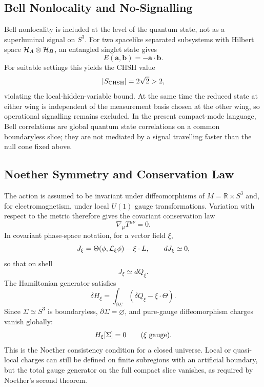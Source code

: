 \documentclass[
  aps,
  prd,
  reprint,
  superscriptaddress,
  nofootinbib,
  longbibliography,
  floatfix,
  amsmath,
  amssymb
]{revtex4-2}
\theoremstyle{plain}
\theoremstyle{definition}
\theoremstyle{remark}
\begin{document}
\subsection{Bell Nonlocality and No-Signalling}

Bell nonlocality is included at the level of the quantum state, not as a
superluminal signal on \(S^3\). For two spacelike separated subsystems
with Hilbert space \({\cal H}_A\otimes{\cal H}_B\), an entangled singlet
state gives
\begin{equation}
  E(\mathbf a,\mathbf b)=-\mathbf a\cdot\mathbf b .
\end{equation}
For suitable settings this yields the CHSH value
\begin{equation}
  |S_{\rm CHSH}|=2\sqrt2>2,
\end{equation}
violating the local-hidden-variable bound. At the same time the reduced
state at either wing is independent of the measurement basis chosen at
the other wing, so operational signalling remains excluded. In the
present compact-mode language, Bell correlations are global quantum
state correlations on a common boundaryless slice; they are not mediated
by a signal travelling faster than the null cone fixed above.

\subsection{Noether Symmetry and Conservation Law}

The action is assumed to be invariant under diffeomorphisms of
\(M=\mathbb R\times S^3\) and, for electromagnetism, under local
\(U(1)\) gauge transformations. Variation with respect to the metric
therefore gives the covariant conservation law
\begin{equation}
  \nabla_\mu T^{\mu\nu}=0 .
\end{equation}
In covariant phase-space notation, for a vector field \(\xi\),
\begin{equation}
  J_\xi=\Theta(\phi,{\cal L}_\xi\phi)-\xi\cdot L,
  \qquad dJ_\xi\simeq 0,
\end{equation}
so that on shell
\begin{equation}
  J_\xi\simeq dQ_\xi .
\end{equation}
The Hamiltonian generator satisfies
\begin{equation}
  \delta H_\xi=\int_{\partial\Sigma}
  \left(\delta Q_\xi-\xi\cdot\Theta\right).
\end{equation}
Since \(\Sigma\simeq S^3\) is boundaryless, \(\partial\Sigma=\varnothing\),
and pure-gauge diffeomorphism charges vanish globally:
\begin{equation}
  H_\xi[\Sigma]=0\qquad (\xi\;{\rm gauge}) .
\end{equation}
This is the Noether consistency condition for a closed universe. Local
or quasi-local charges can still be defined on finite subregions with an
artificial boundary, but the total gauge generator on the full compact
slice vanishes, as required by Noether's second theorem.
\end{document}
